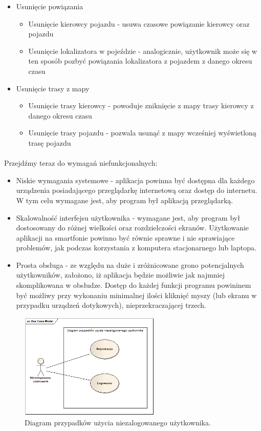 \begin{itemize}
\item Usunięcie powiązania
\begin{itemize}
	\item Usunięcie kierowcy pojazdu - usuwa czasowe powiązanie kierowcy oraz pojazdu
	\item Usunięcie lokalizatora w pojeździe - analogicznie, użytkownik może się w ten sposób pozbyć powiązania lokalizatora z pojazdem z danego okresu czasu
\end{itemize}
\item Usunięcie trasy z mapy
\begin{itemize}
	\item Usunięcie trasy kierowcy - powoduje zniknięcie z mapy trasy kierowcy z danego okresu czasu
	\item Usunięcie trasy pojazdu - pozwala usunąć z mapy wcześniej wyświetloną trasę pojazdu 
\end{itemize}
\end{itemize}


\paragraph{}
Przejdźmy teraz do wymagań niefunkcjonalnych:

\begin{itemize}
	\item Niskie wymagania systemowe - aplikacja powinna być dostępna dla każdego urządzenia posiadającego przeglądarkę internetową oraz dostęp do internetu. W tym celu wymagane jest, aby program był aplikacją przeglądarką.
	\item Skalowalność interfejsu użytkownika - wymagane jest, aby program był dostosowany do różnej wielkości oraz rozdzielczości ekranów. Użytkowanie aplikacji na smartfonie powinno być równie sprawne i nie sprawiające problemów, jak podczas korzystania z komputera stacjonarnego lub laptopa.
	\item Prosta obsługa - ze względu na duże i zróżnicowane grono potencjalnych użytkowników, założono, iż aplikacja będzie możliwie jak najmniej skomplikowana w obsłudze. Dostęp do każdej funkcji programu powininem być możliwy przy wykonaniu minimalnej ilości kliknięć myszy (lub ekranu w przypadku urządzeń dotykowych), nieprzekraczającej trzech.
\end{itemize}

\begin{figure}
\centering
\includegraphics[width=0.6\textwidth]{./graf/Przypadki_uzycia_niezalogowany.png}
\caption{Diagram przypadków użycia niezalogowanego użytkownika.}
\label{fig:1}
\end{figure}

